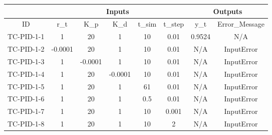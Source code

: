\documentclass[12pt, titlepage]{article}
\begin{document}
\begin{table}[]
\begin{tabular}{|c|c|c|c|c|c|c|c|}
\hline
\multicolumn{1}{|l|}{} & \multicolumn{5}{c|}{Inputs}                    & \multicolumn{2}{c|}{Outputs} \\ \hline
ID                     & r\_t    & K\_p    & K\_d    & t\_sim & t\_step & y\_t      & Error\_Message   \\ \hline
TC-PID-1-1             & 1       & 20      & 1       & 10     & 0.01    & 0.9524    & N/A              \\ \hline
TC-PID-1-2             & -0.0001 & 20      & 1       & 10     & 0.01    & N/A       & InputError       \\ \hline
TC-PID-1-3             & 1       & -0.0001 & 1       & 10     & 0.01    & N/A       & InputError       \\ \hline
TC-PID-1-4             & 1       & 20      & -0.0001 & 10     & 0.01    & N/A       & InputError       \\ \hline
TC-PID-1-5             & 1       & 20      & 1       & 61     & 0.01    & N/A       & InputError       \\ \hline
TC-PID-1-6             & 1       & 20      & 1       & 0.5    & 0.01    & N/A       & InputError       \\ \hline
TC-PID-1-7             & 1       & 20      & 1       & 10     & 0.001   & N/A       & InputError       \\ \hline
TC-PID-1-8            & 1       & 20      & 1       & 10     & 2       & N/A       & InputError       \\ \hline
\end{tabular}
\end{table}
\end{document}

